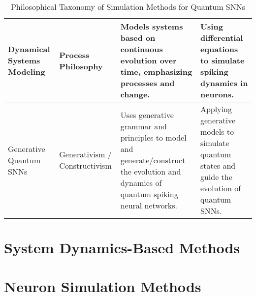 \begin{table}[h!]
\begin{tabular}{|p{3.5cm}|p{2.5cm}|p{4cm}|p{4cm}|}
    \hline
    Dynamical Systems Modeling & Process Philosophy & Models systems based on continuous evolution over time, emphasizing processes and change. & Using differential equations to simulate spiking dynamics in neurons. \\
    \hline
    Generative Quantum SNNs & Generativism / Constructivism & Uses generative grammar and principles to model and generate/construct the evolution and dynamics of quantum spiking neural networks. & Applying generative models to simulate quantum states and guide the evolution of quantum SNNs. \\
    \hline
    \end{tabular}
    \caption{Philosophical Taxonomy of Simulation Methods for Quantum SNNs}
    \label{tab:taxonomy_simulation_methods}
    \end{table}
    

\section{System Dynamics-Based Methods}
\section{Neuron Simulation Methods}
